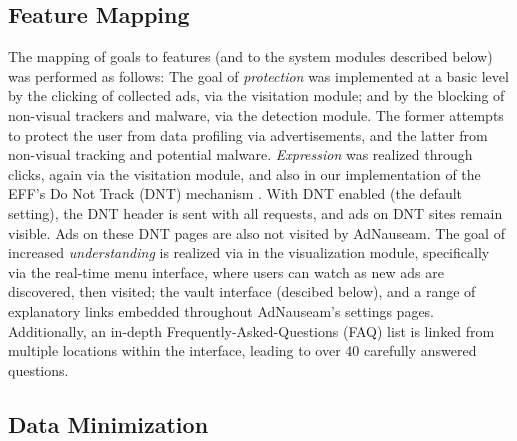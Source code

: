 \documentclass[conference]{IEEEtran}
\begin{document}
\subsection{Feature Mapping}

The mapping of goals to features (and to the system modules described below) was performed as follows: The goal of \emph{protection} was implemented at a basic level by the clicking of collected ads, via the visitation module; and by the blocking of non-visual trackers and malware, via the detection module. The former attempts to protect the user from data profiling via advertisements, and the latter from non-visual tracking and potential malware. \emph{Expression} was realized through clicks, again via the visitation module, and also in our implementation of the EFF's Do Not Track (DNT) mechanism \cite{EFF-1,EFF-2}. With DNT enabled (the default setting), the DNT header is sent with all requests, and ads on DNT sites remain visible. Ads on these DNT pages are also not visited by AdNauseam. The goal of increased \emph{understanding} is realized via in the visualization module, specifically via the real-time menu interface, where users can watch as new ads are discovered, then visited; the vault interface (descibed below), and a range of explanatory links embedded throughout AdNauseam's settings pages. Additionally, an in-depth Frequently-Asked-Questions (FAQ) list is linked from multiple locations within the interface, leading to over 40 carefully answered questions.


\subsection{Data Minimization}
\end{document}

